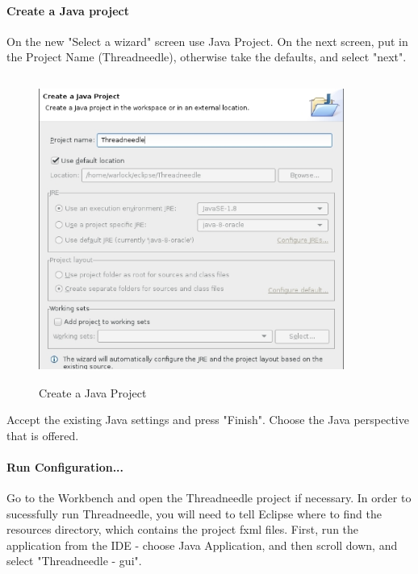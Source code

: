 \documentclass[a4latex]{article}
\begin{document}
\paragraph{Create a Java project} 
\par
On the new "Select a wizard" screen use 
Java Project. On the next screen, put in the Project Name (Threadneedle), 
otherwise take the defaults, and select "next".
\begin{figure}[ht]
\centering
\includegraphics[height=10cm,width=10cm]{images/fig_create.eps}
\caption{Create a Java Project}
\label{fig:create}
\end{figure}
Accept the existing Java settings and press "Finish". Choose the Java
perspective that is offered.

\paragraph{Run Configuration...} 
\par
Go to the Workbench and open the Threadneedle project if necessary. 
In order to sucessfully run Threadneedle, 
you will need to tell Eclipse where to find the resources directory,
which contains the project fxml files. First, run the 
application from the IDE -  choose Java Application, and then scroll down, 
and select "Threadneedle - gui".
\end{document}

